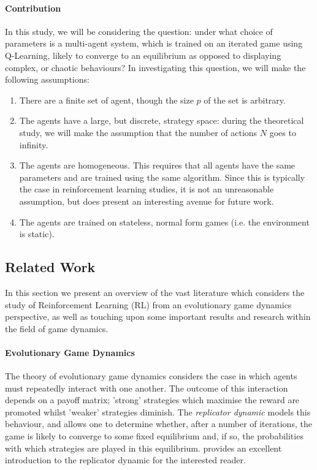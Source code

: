 \documentclass[sigconf,anonymous]{aamas}
\begin{document}
\paragraph{Contribution}
In this study, we will be considering the question: under what choice of parameters is a
multi-agent system, which is trained on an iterated game using Q-Learning, likely to converge to an
equilibrium as opposed to displaying complex, or chaotic behaviours? In investigating this question, we will make the
following assumptions:

\begin{enumerate}
    \item There are a finite set of agent, though the size $p$ of the set is arbitrary. 
    \item The agents have a large, but discrete, strategy space: during the theoretical study, we
    will make the assumption that the number of actions $N$ goes to infinity.
    \item The agents are homogeneous. This requires that all agents have the same parameters and are
    trained using the same algorithm. Since this is typically the case in reinforcement learning
    studies, it is not an unreasonable assumption, but does present an interesting avenue for future
    work.
    \item The agents are trained on stateless, normal form games (i.e. the environment is static).
\end{enumerate}


\subsection{Related Work}

In this section we present an overview of the vast literature which considers the study of Reinforcement Learning (RL) from an evolutionary game dynamics perspective, as well as touching upon some important results and research within the field of game dynamics.

\paragraph{Evolutionary Game Dynamics} The theory of evolutionary game dynamics \cite{Morgenstern44} considers the case in which agents must repeatedly interact with one another. The outcome of this interaction depends on a payoff matrix; 'strong' strategies which maximise the reward are promoted whilst 'weaker' strategies diminish. The \textit{replicator dynamic} models this behaviour, and allows one to determine whether, after a number of iterations, the game is likely to converge to some fixed equilibrium and, if so, the probabilities with which strategies are played in this equilibrium. \cite{ShohamMultiagentFoundations} provides an excellent introduction to the replicator dynamic for the interested reader.
\end{document}
